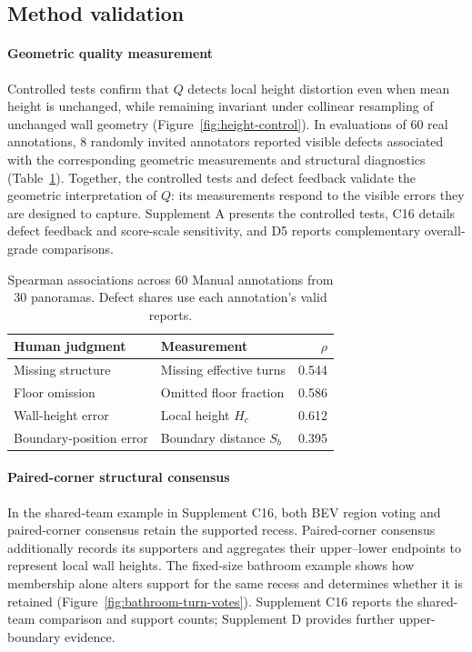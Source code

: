 \subsection{Method validation}
\label{sec:q-validation}\label{sec:human-validation}



\paragraph{Geometric quality measurement}
Controlled tests confirm that $Q$ detects local height distortion even when mean height is unchanged, while remaining invariant under collinear resampling of unchanged wall geometry (Figure~\ref{fig:height-control}). In evaluations of 60 real annotations, 8 randomly invited annotators reported visible defects associated with the corresponding geometric measurements and structural diagnostics (Table~\ref{tab:quality-feedback}). Together, the controlled tests and defect feedback validate the geometric interpretation of $Q$: its measurements respond to the visible errors they are designed to capture. Supplement A presents the controlled tests, C16 details defect feedback and score-scale sensitivity, and D5 reports complementary overall-grade comparisons.

\begin{table}[t]
\centering\small
\caption{Spearman associations across 60 Manual annotations from 30 panoramas. Defect shares use each annotation's valid reports.}
\label{tab:quality-feedback}
\setlength{\tabcolsep}{3pt}\renewcommand{\arraystretch}{1.08}
\begin{tabular}{@{}>{\raggedright\arraybackslash}p{.38\linewidth}>{\raggedright\arraybackslash}p{.43\linewidth}r@{}}
\toprule
Human judgment & Measurement & $\rho$\\
\midrule
Missing structure & Missing effective turns & 0.544\\
Floor omission & Omitted floor fraction & 0.586\\
Wall-height error & Local height $H_c$ & 0.612\\
Boundary-position error & Boundary distance $S_b$ & 0.395\\
\bottomrule
\end{tabular}
\end{table}



\paragraph{Paired-corner structural consensus}
\label{sec:method-validation}
In the shared-team example in Supplement C16, both BEV region voting \cite{lee2018} and paired-corner consensus retain the supported recess. Paired-corner consensus additionally records its supporters and aggregates their upper--lower endpoints to represent local wall heights. The fixed-size bathroom example shows how membership alone alters support for the same recess and determines whether it is retained (Figure~\ref{fig:bathroom-turn-votes}). Supplement C16 reports the shared-team comparison and support counts; Supplement D provides further upper-boundary evidence.


